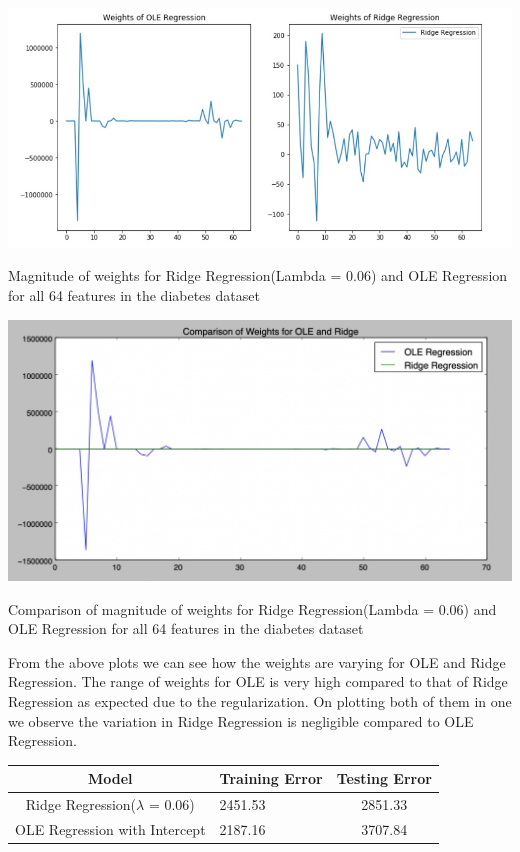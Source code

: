 \documentclass[12pt]{extarticle}
\begin{document}
\begin{center}
  \centering
  \includegraphics[width=\textwidth]{Q3_2.jpeg}
  \caption{Magnitude of weights for Ridge Regression(Lambda = 0.06) and OLE Regression for all 64 features in the diabetes dataset }
\end{center}

\begin{center}
  \centering
  \includegraphics[width=\textwidth]{Q3_1.jpeg}
  \caption{Comparison of magnitude of weights for Ridge Regression(Lambda = 0.06) and OLE Regression for all 64 features in the diabetes dataset }
\end{center}

From the above plots we can see how the weights are varying for OLE and Ridge Regression. The range of weights for OLE is very high compared to that of Ridge Regression as expected due to the regularization. On plotting both of them in one we observe the variation in Ridge Regression is negligible compared to OLE Regression.


\begin{table}[]
\centering
\begin{tabular}{|c|l|c|}
\hline
\rowcolor[HTML]{FFCE93} 
Model & Training Error & Testing Error \\ \hline
Ridge Regression($\lambda$ = 0.06) & 2451.53 & 2851.33 \\ \hline
OLE Regression with Intercept & 2187.16 & 3707.84 \\ \hline
\end{tabular}
\end{table}
\end{document}
